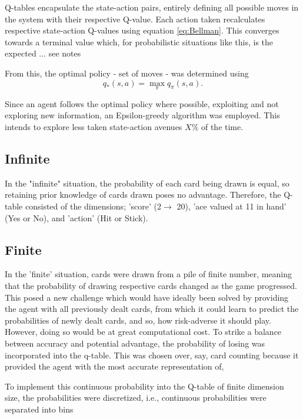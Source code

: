 \smallskip
Q-tables encapsulate the state-action pairs, entirely defining all possible moves in the system with their respective Q-value. Each action taken recalculates respective state-action Q-values using equation \ref{eq:Bellman}. This converges towards a terminal value which, for probabilistic situations like this, is the expected ... see notes

From this, the optimal policy - set of moves - was determined using
\begin{equation} \label{eq:optimal policy}
    q_*(s,a) = \max_{\pi}q_{\pi}(s,a)\text{.}
\end{equation}

\smallskip
Since an agent follows the optimal policy where possible, exploiting  and not exploring new information, an Epsilon-greedy algorithm was employed. This intends to explore less taken state-action avenues \(X\%\) of the time. 

\subsection{Infinite}

In the "infinite" situation, the probability of each card being drawn is equal, so retaining prior knowledge of cards drawn poses no advantage. Therefore, the Q-table consisted of the dimensions; 'score' (2$\rightarrow $ 20), 'ace valued at 11 in hand' (Yes or No), and 'action' (Hit or Stick).


\subsection{Finite}

In the 'finite' situation, cards were drawn from a pile of finite number, meaning that the probability of drawing respective cards changed as the game progressed. This posed a new challenge which would have ideally been solved by providing the agent with all previously dealt cards, from which it could learn to predict the probabilities of newly dealt cards, and so, how risk-adverse it should play. However, doing so would be at great computational cost. To strike a balance between accuracy and potential advantage, the probability of losing was incorporated into the q-table. This was chosen over, say, card counting because it provided the agent with the most accurate representation of, 

To implement this continuous probability into the Q-table of finite dimension size, the probabilities were discretized, i.e., continuous probabilities were separated into bins 


